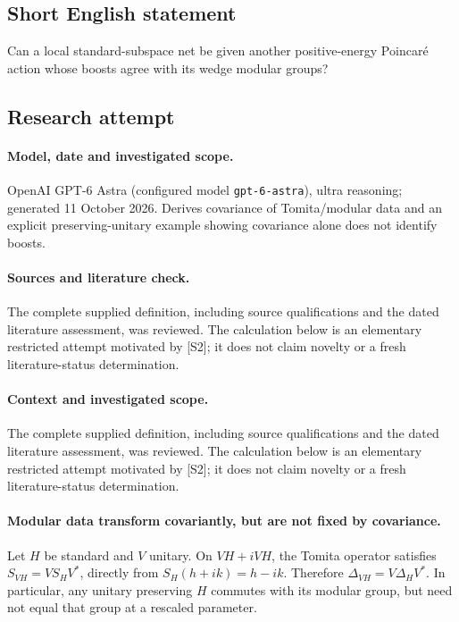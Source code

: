\documentclass[11pt]{article}
\begin{document}
\subsection{Short English statement}
Can a local standard-subspace net be given another positive-energy Poincaré action whose boosts agree with its wedge modular groups?
\subsection{Research attempt}
\paragraph{Model, date and investigated scope.}
OpenAI GPT-6 Astra (configured model \texttt{gpt-6-astra}), ultra reasoning; generated 11 October 2026. Derives covariance of Tomita/modular data and an explicit preserving-unitary example showing covariance alone does not identify boosts.

\paragraph{Sources and literature check.}
The complete supplied definition, including source qualifications and the dated literature assessment, was reviewed. The calculation below is an elementary restricted attempt motivated by [S2]; it does not claim novelty or a fresh literature-status determination.

\paragraph{Context and investigated scope.} The complete supplied definition, including source qualifications and the dated literature assessment, was reviewed. The calculation below is an elementary restricted attempt motivated by [S2]; it does not claim novelty or a fresh literature-status determination.

\paragraph{Modular data transform covariantly, but are not fixed by covariance.} Let $H$ be standard and $V$ unitary. On $VH+iVH$, the Tomita operator satisfies $S_{VH}=VS_HV^*$, directly from $S_H(h+ik)=h-ik$. Therefore $\Delta_{VH}=V\Delta_HV^*$. In particular, any unitary preserving $H$ commutes with its modular group, but need not equal that group at a rescaled parameter.
\end{document}
